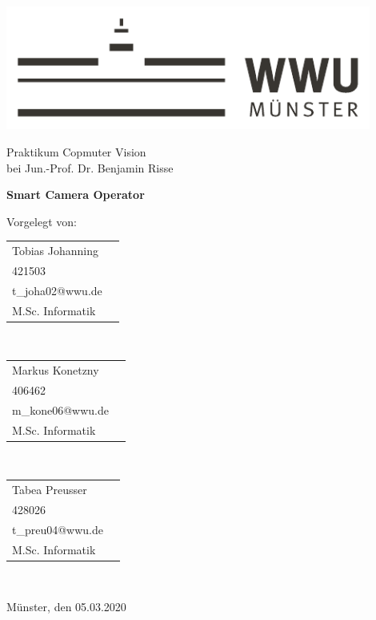 
\begin{centering}
\vspace{4cm}
\includegraphics[width=12cm]{./img/wwu-logo-neu.pdf}

\vspace{2cm} 

{\large
	Praktikum Copmuter Vision\\[0.5cm]
	bei Jun.-Prof. Dr. Benjamin Risse\\[1cm]
}

{\LARGE
	\textbf{Smart Camera Operator}\\[2cm]
}


{\large
	Vorgelegt von:\\[0.5cm]
}



\begin{minipage}{\textwidth}
\begin{minipage}[c]{0.3\textwidth}
\centering
 \begin{tabular}{ll}
 		Tobias Johanning \\
    	{421503} \\
    	{t_joha02@wwu.de} \\
    	 M.Sc. Informatik\\
    \end{tabular}\\
\end{minipage}\hfill
\begin{minipage}[c]{0.3\textwidth}
\centering
   \begin{tabular}{ll}
 		Markus Konetzny \\
    	{406462} \\
    	{m_kone06@wwu.de} \\
    	M.Sc. Informatik\\
    \end{tabular}\\
\end{minipage}\hfill
\begin{minipage}[c]{0.3\textwidth}
\centering
   \begin{tabular}{ll}
 		Tabea Preusser \\
    	{428026} \\
    	{t_preu04@wwu.de} \\
    	M.Sc. Informatik\\
    \end{tabular}\\
\end{minipage}\hfill
\end{minipage}

\vspace{2 cm}
{\large
	Münster, den 05.03.2020\\[1cm]
}
\end{centering}

\vfill


 

